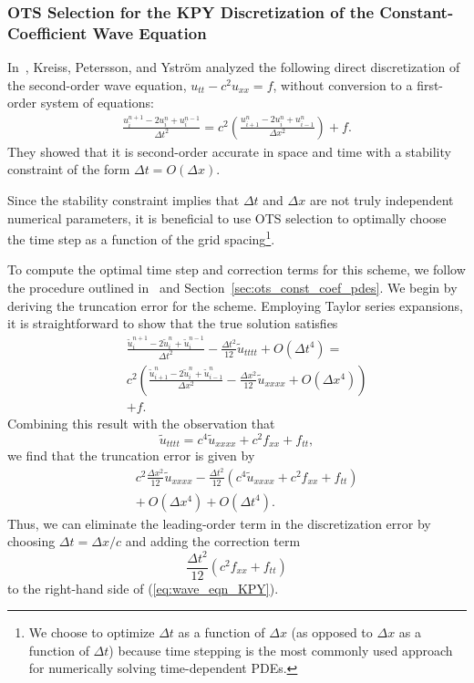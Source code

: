 \documentclass[twocolumn]{article} %
\newcommand{\beq}{\begin{equation}}
\newcommand{\eeq}{\end{equation}}
\newcommand{\bea}{\begin{eqnarray}}
\newcommand{\eea}{\end{eqnarray}}
\def\tu{\tilde{u}}
\def\dt{\Delta t}
\def\dx{\Delta x}
\begin{document}
\subsubsection*{OTS Selection for the KPY Discretization of the 
  Constant-Coefficient Wave Equation}
In~\cite{kreiss2002}, Kreiss, Petersson, and Ystr\"om analyzed the following
direct discretization of the second-order wave equation, 
$u_{tt} - c^2 u_{xx} = f$,
without conversion to a first-order system of equations:
\bea
    \frac{u^{n+1}_i - 2 u^n_i + u^{n-1}_i}{\dt^2}
  = c^2 \left( \frac{u^{n}_{i+1} - 2 u^n_i + u^n_{i-1}}{\dx^2} \right)
  + f.
  \label{eq:wave_eqn_KPY}
\eea
They showed that it is second-order accurate in space and time with a 
stability constraint of the form $\dt = O(\dx)$.

Since the stability constraint implies that $\dt$ and $\dx$ are not truly
independent numerical parameters, it is beneficial to use OTS selection to 
optimally choose the time step as a function of the grid 
spacing\footnote{We choose to optimize $\dt$ as a function of $\dx$ (as 
opposed to $\dx$ as a function of $\dt$) because time stepping is the most 
commonly used approach for numerically solving time-dependent PDEs.}.

To compute the optimal time step and correction terms for this scheme, we 
follow the procedure outlined in~\cite{chu_otspde} and 
Section~\ref{sec:ots_const_coef_pdes}.  We begin by deriving the truncation 
error for the scheme.  Employing Taylor series expansions, it is 
straightforward to show that the true solution satisfies
\bea
  & &\frac{\tu^{n+1}_i - 2 \tu^n_i + \tu^{n-1}_i}{\dt^2}
    - \frac{\dt^2}{12} \tu_{tttt} + O(\dt^4)
  = \nonumber \\
  & & c^2 \left( \frac{\tu^{n}_{i+1} - 2 \tu^n_i + \tu^n_{i-1}}{\dx^2} 
  -\frac{\dx^2}{12} \tu_{xxxx} + O(\dx^4) \right)
  \nonumber \\
  & & +f.
\eea
Combining this result with the observation that 
\beq
  \tu_{tttt} = c^4 \tu_{xxxx} + c^2 f_{xx} + f_{tt},
\eeq
we find that the truncation error is given by
\bea
    & & c^2 \frac{\dx^2}{12} \tu_{xxxx} 
    - \frac{\dt^2}{12} \left(c^4\tu_{xxxx} + c^2 f_{xx} + f_{tt} \right) 
    \nonumber \\
    & & + \ O(\dx^4) + O(\dt^4).
\eea
Thus, we can eliminate the leading-order term in the discretization
error by choosing $\dt = \dx/c$ and adding the correction term 
\beq
  \frac{\dt^2}{12} \left(c^2 f_{xx} + f_{tt} \right) 
\eeq
to the right-hand side of (\ref{eq:wave_eqn_KPY}).  
\end{document}
